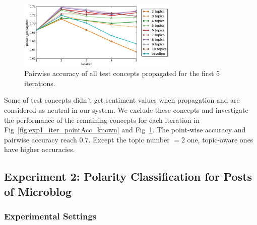 \begin{figure}[!t]
\centering
\includegraphics[width=3in]{fig/exp1_iterations/pairAcc_propagated.jpg}
\caption{Pairwise accuracy of all test concepts propagated for the first 5 iterations.}
\label{fig:exp1_iter_pairAcc_known}
\end{figure}

Some of test concepts didn't get sentiment values when propagation and are considered as neutral in our system. We exclude these concepts and investigate the performance of the remaining concepts for each iteration in Fig~\ref{fig:exp1_iter_pointAcc_known} and Fig~\ref{fig:exp1_iter_pairAcc_known}. The point-wise accuracy and pairwise accuracy reach 0.7. Except the topic number $=2$ one, topic-aware ones have higher accuracies.


\subsection{Experiment 2: Polarity Classification for Posts of Microblog}

\subsubsection{Experimental Settings}
